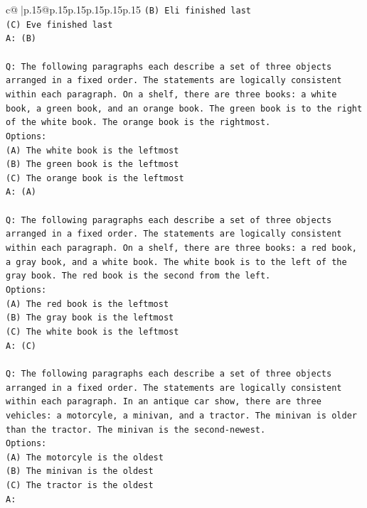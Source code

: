 \documentclass{article}
\begin{document}
{\begin{supertabular}{c@{$\;$}|p{.15\linewidth}@{}p{.15\linewidth}p{.15\linewidth}p{.15\linewidth}p{.15\linewidth}p{.15\linewidth}}
{{{\texttt{(B) Eli finished last} \\
\texttt{(C) Eve finished last} \\
\texttt{A: (B)} \\
\\ 
\texttt{Q: The following paragraphs each describe a set of three objects arranged in a fixed order. The statements are logically consistent within each paragraph. On a shelf, there are three books: a white book, a green book, and an orange book. The green book is to the right of the white book. The orange book is the rightmost.} \\
\texttt{Options:} \\
\texttt{(A) The white book is the leftmost} \\
\texttt{(B) The green book is the leftmost} \\
\texttt{(C) The orange book is the leftmost} \\
\texttt{A: (A)} \\
\\ 
\texttt{Q: The following paragraphs each describe a set of three objects arranged in a fixed order. The statements are logically consistent within each paragraph. On a shelf, there are three books: a red book, a gray book, and a white book. The white book is to the left of the gray book. The red book is the second from the left.} \\
\texttt{Options:} \\
\texttt{(A) The red book is the leftmost} \\
\texttt{(B) The gray book is the leftmost} \\
\texttt{(C) The white book is the leftmost} \\
\texttt{A: (C)} \\
\\ 
\texttt{Q: The following paragraphs each describe a set of three objects arranged in a fixed order. The statements are logically consistent within each paragraph. In an antique car show, there are three vehicles: a motorcyle, a minivan, and a tractor. The minivan is older than the tractor. The minivan is the second{-}newest.} \\
\texttt{Options:} \\
\texttt{(A) The motorcyle is the oldest} \\
\texttt{(B) The minivan is the oldest} \\
\texttt{(C) The tractor is the oldest} \\
\texttt{A:} \\
            }
        }
    }
     \\ \\


\end{supertabular}}
\end{document}
